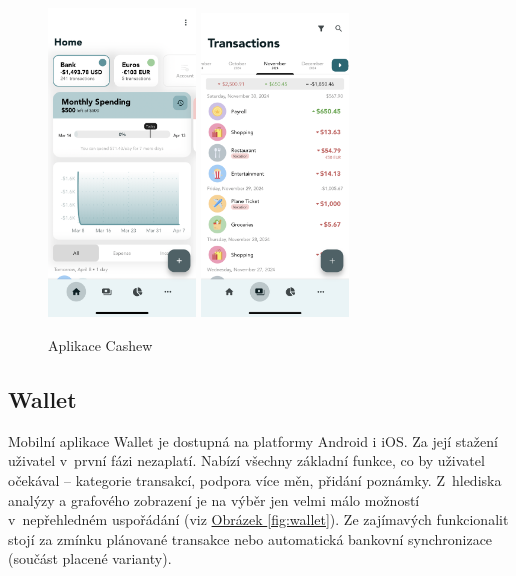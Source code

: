 \documentclass[
  biblatex,
  figures=true,
  tables=false,
  glossaries,
  index
]{kidiplom}
\begin{document}
\begin{figure}
  \centering
    \includegraphics[width=0.35\textwidth]{images/cashew2.PNG}
    \hspace{10px}
    \includegraphics[width=0.35\textwidth]{images/cashew1.PNG}
  \caption{Aplikace Cashew}
  \label{fig:cashew}
\end{figure}

\subsection{Wallet}
Mobilní aplikace Wallet \cite{wallet} je dostupná na platformy Android i iOS. Za její stažení uživatel v~první fázi nezaplatí. Nabízí všechny základní funkce, co by uživatel očekával -- kategorie transakcí, podpora více měn, přidání poznámky. Z~hlediska analýzy a grafového zobrazení je na výběr jen velmi málo možností v~nepřehledném uspořádání (viz \hyperref[fig:wallet]{Obrázek \ref{fig:wallet}}). Ze zajímavých funkcionalit stojí za zmínku plánované transakce nebo automatická bankovní synchronizace (součást placené varianty).
\end{document}
